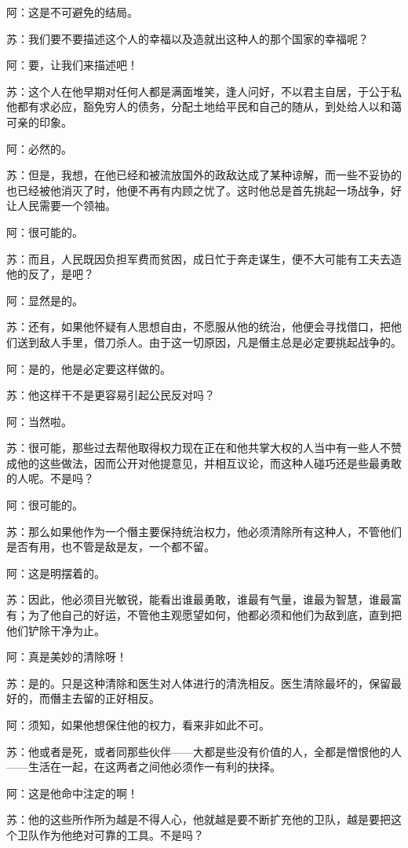 \documentclass[12pt,oneside]{book}
\begin{document}
阿：这是不可避免的结局。

苏：我们要不要描述这个人的幸福以及造就出这种人的那个国家的幸福呢？

阿：要，让我们来描述吧！

苏：这个人在他早期对任何人都是满面堆笑，逢人问好，不以君主自居，于公于私他都有求必应，豁免穷人的债务，分配土地给平民和自己的随从，到处给人以和蔼可亲的印象。

阿：必然的。

苏：但是，我想，在他已经和被流放国外的政敌达成了某种谅解，而一些不妥协的也已经被他消灭了时，他便不再有内顾之忧了。这时他总是首先挑起一场战争，好让人民需要一个领袖。

阿：很可能的。

苏：而且，人民既因负担军费而贫困，成日忙于奔走谋生，便不大可能有工夫去造他的反了，是吧？

阿：显然是的。

苏：还有，如果他怀疑有人思想自由，不愿服从他的统治，他便会寻找借口，把他们送到敌人手里，借刀杀人。由于这一切原因，凡是僭主总是必定要挑起战争的。

阿：是的，他是必定要这样做的。

苏：他这样干不是更容易引起公民反对吗？

阿：当然啦。

苏：很可能，那些过去帮他取得权力现在正在和他共掌大权的人当中有一些人不赞成他的这些做法，因而公开对他提意见，并相互议论，而这种人碰巧还是些最勇敢的人呢。不是吗？

阿：很可能的。

苏：那么如果他作为一个僭主要保持统治权力，他必须清除所有这种人，不管他们是否有用，也不管是敌是友，一个都不留。

阿：这是明摆着的。

苏：因此，他必须目光敏锐，能看出谁最勇敢，谁最有气量，谁最为智慧，谁最富有；为了他自己的好运，不管他主观愿望如何，他都必须和他们为敌到底，直到把他们铲除干净为止。

阿：真是美妙的清除呀！

苏：是的。只是这种清除和医生对人体进行的清洗相反。医生清除最坏的，保留最好的，而僭主去留的正好相反。

阿：须知，如果他想保住他的权力，看来非如此不可。

苏：他或者是死，或者同那些伙伴——大都是些没有价值的人，全都是憎恨他的人——生活在一起，在这两者之间他必须作一有利的抉择。

阿：这是他命中注定的啊！

苏：他的这些所作所为越是不得人心，他就越是要不断扩充他的卫队，越是要把这个卫队作为他绝对可靠的工具。不是吗？
\end{document}
